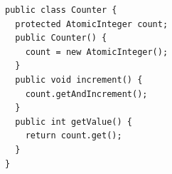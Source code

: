 \begin{lstlisting}
public class Counter {
  protected AtomicInteger count;
  public Counter() {
    count = new AtomicInteger();
  }
  public void increment() {
    count.getAndIncrement();
  }
  public int getValue() {
    return count.get();
  }
}
\end{lstlisting}
\begin{figure}
	\centering

\end{figure}
